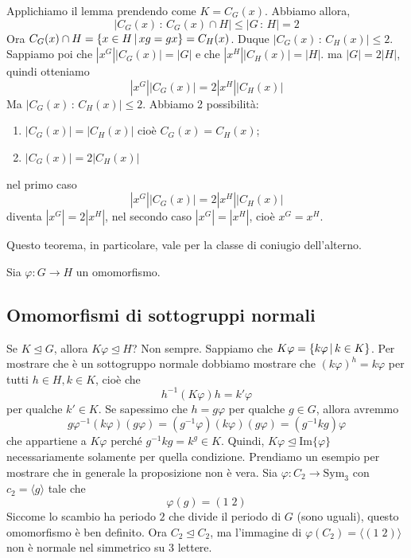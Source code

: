 \documentclass[a4paper]{article}
\begin{document}
\begin{snippetproof}{}
    Applichiamo il lemma prendendo come 
    \(K = C_G(x)\). Abbiamo allora, 
    \[
        |C_G(x) \,:\, C_G(x) \cap H| \leq |G\,:\,H| = 2
    \]
    Ora \(C_G(x) \cap H = \{x\in H \,|\, xg = gx\} = C_H(x)\).
    Duque \(|C_G(x)\,:\,C_H(x)| \leq 2\).
    Sappiamo poi che \(|x^G||C_G(x)| = |G|\)
    e che \(|x^H||C_H(x)| = |H|\).
    ma \(|G| = 2|H|\), quindi otteniamo
    \[
        |x^G||C_G(x)| = 2|x^H||C_H(x)|
    \]
    Ma \(|C_G(x) \,:\, C_H(x)| \leq 2\).
    Abbiamo 2 possibilità:
    \begin{enumerate}
        \item \(|C_G(x)| = |C_H(x)|\) cioè \(C_G(x) = C_H(x)\);
        \item \(|C_G(x)| = 2|C_H(x)|\)
    \end{enumerate}
    nel primo caso
    \[
        |x^G||C_G(x)| = 2|x^H||C_H(x)|
    \]
    diventa \(|x^G| = 2|x^H|\), nel secondo caso \(|x^G| = |x^H|\), cioè \(x^G = x^H\).
\end{snippetproof}

Questo teorema, in particolare, vale per la classe di coniugio dell'alterno.

Sia \(\varphi \colon G \to H\) un omomorfismo.

\subsection{Omomorfismi di sottogruppi normali}

Se \(K \unlhd G\), allora \(K\varphi \unlhd H\)? Non sempre.
Sappiamo che \(K\varphi = \{k\varphi \,|\, k\in K\}\).
Per mostrare che è un sottogruppo normale dobbiamo mostrare che
\({(k\varphi)}^h = k\varphi\) per tutti \(h \in H, k \in K\),
cioè che
\[
    h^{-1}(K\varphi)h = k'\varphi
\]
per qualche \(k' \in K\).
Se sapessimo che \(h = g\varphi\) per qualche \(g\in G\), allora avremmo
\[
    g\varphi^{-1}(k\varphi)(g\varphi) =
    (g^{-1} \varphi)(k\varphi)(g\varphi)
    = (g^{-1}kg)\varphi
\]
che appartiene a \(K\varphi\) perché \(g^{-1} k g = k^g \in K\).
Quindi, \(K\varphi \unlhd \text{Im}\{\varphi\}\) necessariamente solamente per quella condizione.
Prendiamo un esempio per mostrare che in generale la proposizione non è vera.
Sia \(\varphi \colon C_2 \to \text{Sym}_3\) con \(c_2 = \langle g \rangle\) tale che
\[
    \varphi(g) = (1\;2)
\]
Siccome lo scambio ha periodo \(2\) che divide il periodo di \(G\) (sono uguali),
questo omomorfismo è ben definito. Ora \(C_2 \unlhd C_2\), ma l'immagine di \(\varphi(C_2) = \langle (1\;2) \rangle\)
non è normale nel simmetrico su 3 lettere.
\end{document}
